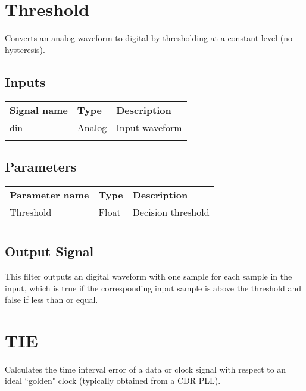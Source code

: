 \pagebreak
\section{Threshold}

Converts an analog waveform to digital by thresholding at a constant level (no hysteresis).

\subsection{Inputs}

\begin{tabularx}{16cm}{llX}
\thickhline
\textbf{Signal name} & \textbf{Type} & \textbf{Description} \\
\thickhline
din & Analog & Input waveform \\
\thickhline
\end{tabularx}

\subsection{Parameters}

\begin{tabularx}{16cm}{llX}
\thickhline
\textbf{Parameter name} & \textbf{Type} & \textbf{Description} \\
\thickhline
Threshold & Float & Decision threshold \\
\thickhline
\end{tabularx}

\subsection{Output Signal}

This filter outputs an digital waveform with one sample for each sample in the input, which is true if the
corresponding input sample is above the threshold and false if less than or equal.

\pagebreak
\section{TIE}

Calculates the time interval error of a data or clock signal with respect to an ideal ``golden" clock (typically
obtained from a CDR PLL).

